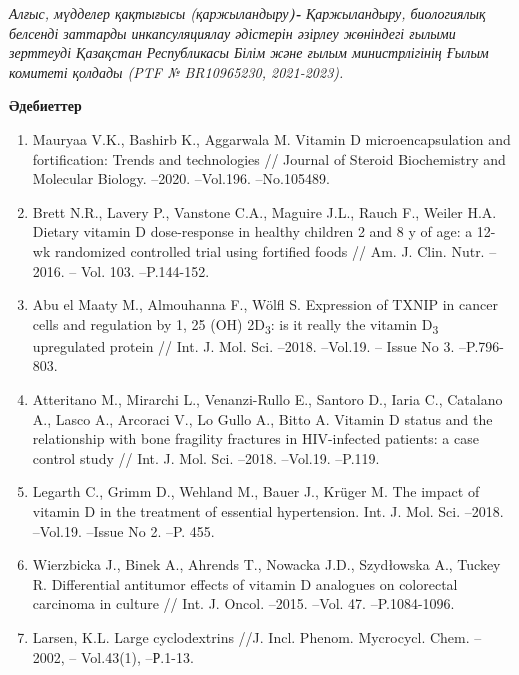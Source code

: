 \emph{Алғыс, мүдделер қақтығысы (қаржыландыру{\bfseries )-} Қаржыландыру,
биологиялық белсенді заттарды инкапсуляциялау әдістерін әзірлеу
жөніндегі ғылыми зерттеуді Қазақстан Республикасы Білім және ғылым
министрлігінің Ғылым комитеті қолдады (PTF № BR10965230, 2021-2023).}

\begin{center}
{\bfseries Әдебиеттер}
\end{center}

\begin{enumerate}
\item
Mauryaa V.K., Bashirb K., Aggarwala M. Vitamin D microencapsulation
and fortification: Trends and technologies // Journal of Steroid
Biochemistry and Molecular Biology. --2020. --Vol.196. --No.105489.

\item
Brett N.R., Lavery P., Vanstone C.A., Maguire J.L., Rauch F., Weiler
H.A. Dietary vitamin D dose-response in healthy children 2 and 8 y of
age: a 12-wk randomized controlled trial using fortified foods // Am. J.
Clin. Nutr. --2016. -- Vol. 103. --P.144-152.

\item
Abu el Maaty M., Almouhanna F., Wölfl S. Expression of TXNIP in
cancer cells and regulation by 1, 25 (OH) 2D\textsubscript{3}: is it
really the vitamin D\textsubscript{3} upregulated protein // Int. J.
Mol. Sci. --2018. --Vol.19. -- Issue No 3. --P.796-803.

\item
Atteritano M., Mirarchi L., Venanzi-Rullo E., Santoro D., Iaria C.,
Catalano A., Lasco A., Arcoraci V., Lo Gullo A., Bitto A. Vitamin D
status and the relationship with bone fragility fractures in
HIV-infected patients: a case control study // Int. J. Mol. Sci. --2018.
--Vol.19. --P.119.

\item
Legarth C., Grimm D., Wehland M., Bauer J., Krüger M. The impact of
vitamin D in the treatment of essential hypertension. Int. J. Mol. Sci.
--2018. --Vol.19. --Issue No 2. --P. 455.

\item
Wierzbicka J., Binek A., Ahrends T., Nowacka J.D., Szydłowska A.,
Tuckey R. Differential antitumor effects of vitamin D analogues on
colorectal carcinoma in culture // Int. J. Oncol. --2015. --Vol. 47.
--P.1084-1096.

\item
Larsen, K.L. Large cyclodextrins //J. Incl. Phenom. Mycrocycl. Chem.
--2002, -- Vol.43(1), --Р.1-13.


\end{enumerate}
